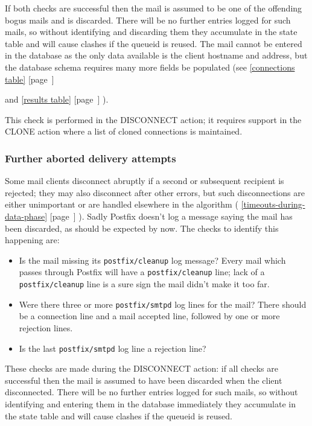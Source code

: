 \documentclass[a4paper,12pt,draft]{article}
\newcommand{\refwithpage}[1]{%
    \empty{}\ref{#1} [page~\pageref{#1}]%
}
\newcommand{\sectionref}[1]{%
    \textsection{}\refwithpage{#1}%
}
\newcommand{\daemon}[1]{%
    \texttt{postfix/#1}%
}
\begin{document}
If both checks are successful then the mail is assumed to be one of the
offending bogus mails and is discarded.  There will be no further entries
logged for such mails, so without identifying and discarding them they
accumulate in the state table and will cause clashes if the queueid is
reused.  The mail cannot be entered in the database as the only data
available is the client hostname and \IP{} address, but the database schema
requires many more fields be populated (see \sectionref{connections table}
and \sectionref{results table}).

This check is performed in the DISCONNECT action; it requires support in
the CLONE action where a list of cloned connections is maintained.

\subsubsection{Further aborted delivery attempts}

Some mail clients disconnect abruptly if a second or subsequent recipient
is rejected; they may also disconnect after other errors, but such
disconnections are either unimportant or are handled elsewhere in the
algorithm (\sectionref{timeouts-during-data-phase}).  Sadly Postfix doesn't
log a message saying the mail has been discarded, as should be expected by
now.  The checks to identify this happening are:

\begin{itemize}

    \item Is the mail missing its \daemon{cleanup} log message?  Every mail
        which passes through Postfix will have a \daemon{cleanup} line;
        lack of a \daemon{cleanup} line is a sure sign the mail didn't make
        it too far.

    \item Were there three or more \daemon{smtpd} log lines for the mail?
        There should be a connection line and a mail accepted line,
        followed by one or more rejection lines.

    \item Is the last \daemon{smtpd} log line a rejection line?

\end{itemize}

These checks are made during the DISCONNECT action: if all checks are
successful then the mail is assumed to have been discarded when the client
disconnected.  There will be no further entries logged for such mails, so
without identifying and entering them in the database immediately they
accumulate in the state table and will cause clashes if the queueid is
reused.
\end{document}
